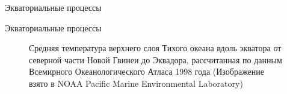 \begin{chapter}{Экваториальные процессы}
\begin{section}{Экваториальные процессы}
\begin{figure}[t!]
\begin{centering}
\end{centering}
\caption{Средняя температура верхнего слоя Тихого океана вдоль экватора от
северной части Новой Гвинеи до Эквадора, рассчитанная по данным
Всемирного Океанологического Атласа 1998 года (Изображение взято в
NOAA Pacific Marine Environmental Laboratory)}  
\label{fig:equator}
\vspace{-2ex}
\end{figure}
%
%


\end{section}
\end{chapter}

